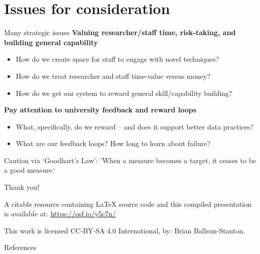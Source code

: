 \documentclass[aspectratio=169, 11pt]{beamer} %
\begin{document}
\section{Issues for consideration}
\begin{frame}{Many strategic issues}
\textbf{Valuing researcher/staff time,  risk-taking, and building general capability}
\begin{itemize}
    \item How do we create space for staff to engage with novel techniques?
    \item How do we treat researcher and staff time-value versus money?
    \item How do we get our system to reward general skill/capability building?
\end{itemize}
    
\textbf{Pay attention to university feedback and reward loops}    
    \begin{itemize}
    \item What, specifically, do we reward -- and does it support better data practices?
    \item What are our feedback loops? How long to learn about failure?
\end{itemize}


Caution via `Goodhart's Law': 'When a measure becomes a target, it ceases to be a good measure.` \parencite{Strathern1997-du, Goodhart1975-cq}

\end{frame}



\begin{frame}{Thank you!}


A citable resource containing \LaTeX{} source code and this compiled presentation is available at: \url{https://osf.io/y5c7n/}

This work is licensed CC-BY-SA 4.0 International, by: Brian Ballsun-Stanton. 

\end{frame}



\begin{frame}{References}
\printbibliography[heading=none]
\end{frame}
\end{document}
